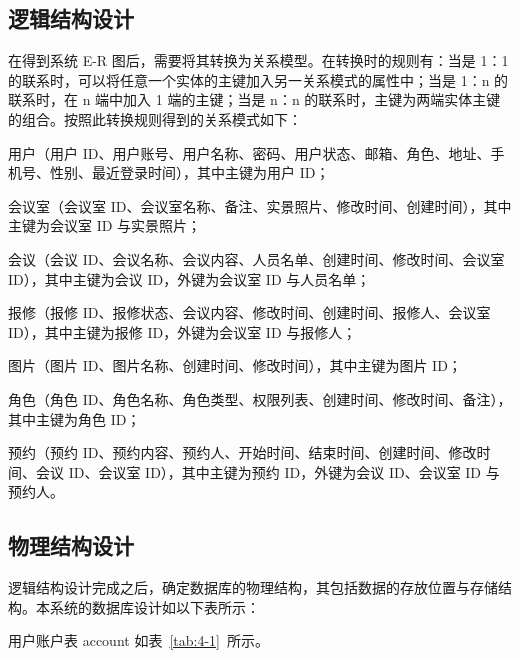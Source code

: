 \documentclass{izdthesis}
\begin{document}
\subsection{逻辑结构设计}
在得到系统 E-R 图后，需要将其转换为关系模型。在转换时的规则有：当是 1：1 的联系时，可以将任意一个实体的主键加入另一关系模式的属性中；当是 1：n 的联系时，在 n 端中加入 1 端的主键；当是 n：n 的联系时，主键为两端实体主键的组合\cite{ref10}。按照此转换规则得到的关系模式如下：

用户（用户 ID、用户账号、用户名称、密码、用户状态、邮箱、角色、地址、手机号、性别、最近登录时间），其中主键为用户 ID；

会议室（会议室 ID、会议室名称、备注、实景照片、修改时间、创建时间），其中主键为会议室 ID 与实景照片；

会议（会议 ID、会议名称、会议内容、人员名单、创建时间、修改时间、会议室 ID），其中主键为会议 ID，外键为会议室 ID 与人员名单；

报修（报修 ID、报修状态、会议内容、修改时间、创建时间、报修人、会议室 ID），其中主键为报修 ID，外键为会议室 ID 与报修人；

图片（图片 ID、图片名称、创建时间、修改时间），其中主键为图片 ID；

角色（角色 ID、角色名称、角色类型、权限列表、创建时间、修改时间、备注），其中主键为角色 ID；

预约（预约 ID、预约内容、预约人、开始时间、结束时间、创建时间、修改时间、会议 ID、会议室 ID），其中主键为预约 ID，外键为会议 ID、会议室 ID 与预约人。

\subsection{物理结构设计}
逻辑结构设计完成之后，确定数据库的物理结构，其包括数据的存放位置与存储结构。本系统的数据库设计如以下表所示：

用户账户表 account 如表~\ref{tab:4-1}~所示。
\end{document}
